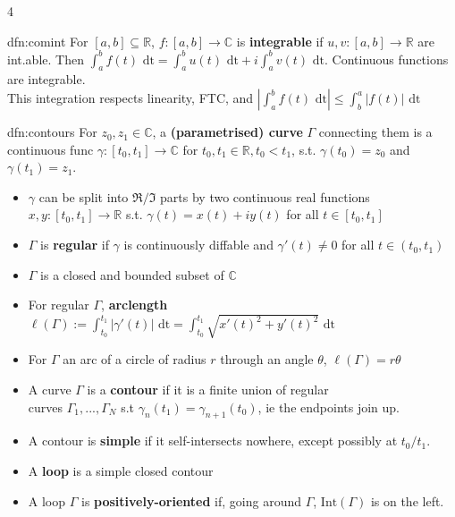 \documentclass[landscape, 8pt]{extarticle}
\begin{document}
\begin{multicols*}{4}
	\begin{dfn}{dfn:comint}{ }
		For $[a, b] \subseteq \mathbb{R}$, $f: [a,b] \to \mathbb{C}$ is \textbf{integrable} if $u, v : [a, b] \to \mathbb{R}$ are int.able. Then $\int_{a}^{b}f(t) \text{ dt} = \int_{a}^{b}u(t) \text{ dt} + i \int_{a}^{b} v(t) \text{ dt}$. Continuous functions are integrable. \\
		This integration respects linearity, FTC, and $\left|\int_{a}^{b} f(t) \text{ dt}\right| \le \int_{b}^{a} \left|f(t)\right| \text{ dt}$
		
	\end{dfn}
	
	\begin{dfn}{dfn:contours}{ }
		For $z_0, z_1 \in \mathbb{C}$, a \textbf{(parametrised) curve} $\Gamma$ connecting them is a continuous func $\gamma : [t_0, t_1] \to \mathbb{C}$ for $t_0, t_1 \in \mathbb{R}, t_0 < t_1$, s.t. $\gamma(t_0) = z_0$ and $\gamma(t_1) = z_1$.
		\begin{itemize}
			\item $\gamma$ can be split into $\Re/\Im$ parts by two continuous real functions $x, y : [t_0, t_1] \to \mathbb{R}$ s.t. $\gamma(t) = x(t) + iy(t)$ for all $t \in [t_0, t_1]$
			\item $\Gamma$ is \textbf{regular} if $\gamma$ is continuously diffable and $\gamma'(t) \ne 0$ for all $t \in (t_0, t_1)$
			\item $\Gamma$ is a closed and bounded subset of $\mathbb{C}$
			\item For regular $\Gamma$, \textbf{arclength} $\ell(\Gamma) := \int_{t_0}^{t_1}\left|\gamma'(t)\right| \text{ dt} = \int_{t_0}^{t_1} \sqrt{x'(t)^2 + y'(t)^2} \text{ dt}$
			\item For $\Gamma$ an arc of a circle of radius $r$ through an angle $\theta$, $\ell(\Gamma) = r\theta$
			\item A curve $\Gamma$ is a \textbf{contour} if it is a finite union of regular\\
			curves $\Gamma_1, ..., \Gamma_N$ s.t $\gamma_n(t_1) = \gamma_{n+1}(t_0)$, ie the endpoints join up.
			\item A contour is \textbf{simple} if it self-intersects nowhere, except possibly at $t_0/t_1$.
			\item A \textbf{loop} is a simple closed contour
			\item A loop $\Gamma$ is \textbf{positively-oriented} if, going around $\Gamma$, $\text{Int}(\Gamma)$ is on the left.
		\end{itemize}
		

\end{dfn}
\end{multicols*}
\end{document}

